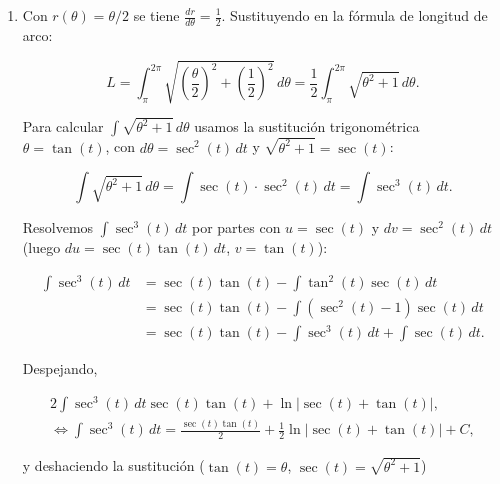 \documentclass[
  spanish,
  a4paper,
]{scrreport}
\theoremstyle{definition}
\theoremstyle{remark}
\begin{document}
\begin{tcolorbox}[enhanced jigsaw, arc=.35mm, bottomrule=.15mm, bottomtitle=1mm, breakable, colback=white, colbacktitle=quarto-callout-tip-color!10!white, colframe=quarto-callout-tip-color-frame, coltitle=black, left=2mm, leftrule=.75mm, opacityback=0, opacitybacktitle=0.6, rightrule=.15mm, title=\textcolor{quarto-callout-tip-color}{\faLightbulb}\hspace{0.5em}{Solución}, titlerule=0mm, toprule=.15mm, toptitle=1mm]

\begin{enumerate}
\def\labelenumi{\alph{enumi}.}
\item
  Con \(r(\theta) = \theta/2\) se tiene
  \(\frac{dr}{d\theta} = \frac{1}{2}\). Sustituyendo en la fórmula de
  longitud de arco:

  \[
  L = \int_{\pi}^{2\pi} \sqrt{\left(\frac{\theta}{2}\right)^2 + \left(\frac{1}{2}\right)^2}\, d\theta
  = \frac{1}{2}\int_{\pi}^{2\pi} \sqrt{\theta^2 + 1}\, d\theta.
  \]

  Para calcular \(\int \sqrt{\theta^2+1}\, d\theta\) usamos la
  sustitución trigonométrica \(\theta = \tan(t)\), con
  \(d\theta = \sec^2(t)\, dt\) y \(\sqrt{\theta^2+1} = \sec(t)\):

  \[
  \int \sqrt{\theta^2+1}\, d\theta = \int \sec(t)\cdot\sec^2(t)\, dt = \int \sec^3(t)\, dt.
  \]

  Resolvemos \(\int \sec^3(t)\, dt\) por partes con \(u = \sec(t)\) y
  \(dv = \sec^2(t)\, dt\) (luego \(du = \sec(t)\tan(t)\, dt\),
  \(v = \tan(t)\)):

  \begin{align*}
  \int \sec^3(t)\, dt &= \sec(t)\tan(t) - \int \tan^2(t)\sec(t)\, dt \\
  &= \sec(t)\tan(t) - \int (\sec^2(t)-1)\sec(t)\, dt \\
  &= \sec(t)\tan(t) - \int \sec^3(t)\, dt + \int \sec(t)\, dt.
  \end{align*}

  Despejando,

  \[
  \begin{gathered}
  2\int \sec^3(t)\, dt  \sec(t)\tan(t) + \ln|\sec(t)+\tan(t)|, \\
  \Leftrightarrow
  \int \sec^3(t)\, dt = \frac{\sec(t)\tan(t)}{2} + \frac{1}{2}\ln|\sec(t)+\tan(t)| + C,
  \end{gathered}
  \]

  y deshaciendo la sustitución (\(\tan(t) = \theta\),
  \(\sec(t) = \sqrt{\theta^2+1}\))


\end{enumerate}
\end{tcolorbox}
\end{document}
